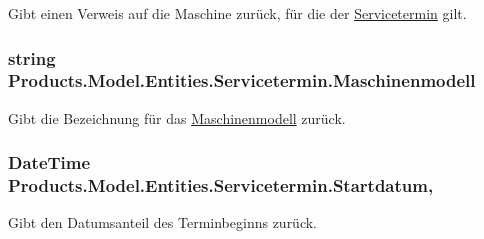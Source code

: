 Gibt einen Verweis auf die Maschine zurück, für die der \hyperlink{class_products_1_1_model_1_1_entities_1_1_servicetermin}{Servicetermin} gilt. 

\subsubsection[{\texorpdfstring{Maschinenmodell}{Maschinenmodell}}]{\setlength{\rightskip}{0pt plus 5cm}string Products.\+Model.\+Entities.\+Servicetermin.\+Maschinenmodell\hspace{0.3cm}{\ttfamily [get]}}\hypertarget{class_products_1_1_model_1_1_entities_1_1_servicetermin_aaa083b061700e5889cc19c342110ce8d}{}\label{class_products_1_1_model_1_1_entities_1_1_servicetermin_aaa083b061700e5889cc19c342110ce8d}


Gibt die Bezeichnung für das \hyperlink{class_products_1_1_model_1_1_entities_1_1_maschinenmodell}{Maschinenmodell} zurück. 

\subsubsection[{\texorpdfstring{Startdatum}{Startdatum}}]{\setlength{\rightskip}{0pt plus 5cm}Date\+Time Products.\+Model.\+Entities.\+Servicetermin.\+Startdatum\hspace{0.3cm}{\ttfamily [get]}, {\ttfamily [set]}}\hypertarget{class_products_1_1_model_1_1_entities_1_1_servicetermin_a35978d3b6057936a8582f9ba8a623161}{}\label{class_products_1_1_model_1_1_entities_1_1_servicetermin_a35978d3b6057936a8582f9ba8a623161}


Gibt den Datumsanteil des Terminbeginns zurück. 

